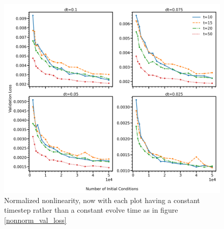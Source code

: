 \documentclass[11pt]{article} %
\numberwithin{equation}{section}  %
\begin{document}
\begin{figure}
	\centering
	
	\includegraphics[width=\linewidth]{figures/nonnorm_val_loss_evolve_time}
	\caption{Normalized nonlinearity, now with each plot having a constant timestep rather than a constant evolve time as in figure \ref{nonnorm_val_loss}}\label{nonnorm_val_loss_evolve_time}
\end{figure}


\end{document}
